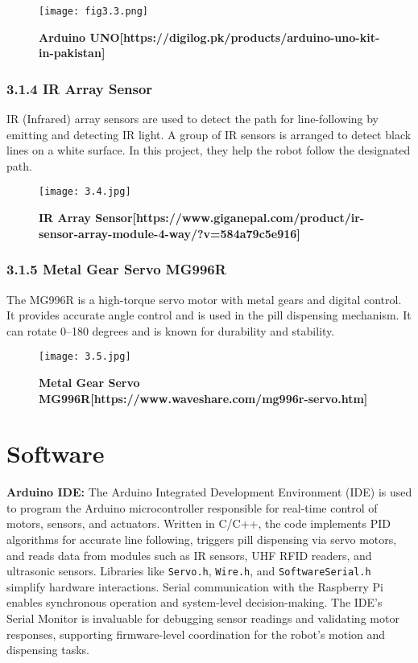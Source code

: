 \begin{figure}[H]
    \centering
    \texttt{[image: fig3.3.png]}
    \caption{\textbf{Arduino UNO[https://digilog.pk/products/arduino-uno-kit-in-pakistan]}}
    \label{fig:3.3}
\end{figure}

\subsubsection*{3.1.4 IR Array Sensor}

IR (Infrared) array sensors are used to detect the path for line-following by emitting and detecting IR light. A group of IR sensors is arranged to detect black lines on a white surface. In this project, they help the robot follow the designated path.

\begin{figure}[H]
    \centering
    \texttt{[image: 3.4.jpg]}
    \caption{\textbf{IR Array Sensor[https://www.giganepal.com/product/ir-sensor-array-module-4-way/?v=584a79c5e916]}}
    \label{fig:3.4}
\end{figure}

\subsubsection*{3.1.5 Metal Gear Servo MG996R}

The MG996R is a high-torque servo motor with metal gears and digital control. It provides accurate angle control and is used in the pill dispensing mechanism. It can rotate 0–180 degrees and is known for durability and stability.

\begin{figure}[H]
    \centering
    \texttt{[image: 3.5.jpg]}
    \caption{\textbf{Metal Gear Servo MG996R[https://www.waveshare.com/mg996r-servo.htm]}}
    \label{fig:3.5}
\end{figure}

\section{Software}

\textbf{Arduino IDE:} The Arduino Integrated Development Environment (IDE) is used to program the Arduino microcontroller responsible for real-time control of motors, sensors, and actuators. Written in C/C++, the code implements PID algorithms for accurate line following, triggers pill dispensing via servo motors, and reads data from modules such as IR sensors, UHF RFID readers, and ultrasonic sensors. Libraries like \texttt{Servo.h}, \texttt{Wire.h}, and \texttt{SoftwareSerial.h} simplify hardware interactions. Serial communication with the Raspberry Pi enables synchronous operation and system-level decision-making. The IDE’s Serial Monitor is invaluable for debugging sensor readings and validating motor responses, supporting firmware-level coordination for the robot’s motion and dispensing tasks.

